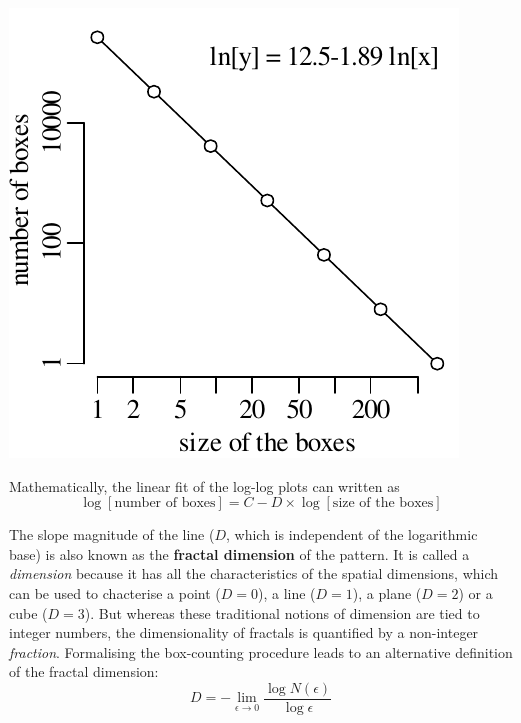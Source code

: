 \noindent\begin{minipage}[t][][b]{.3\textwidth}
  \includegraphics[width=\textwidth]{../figures/sierpinskiboxcounts.pdf}\medskip
\end{minipage}
\begin{minipage}[t][][t]{.7\textwidth}
  \label{fig:sierpinskiboxcounts}
\end{minipage}

Mathematically, the linear fit of the log-log plots can written as
\begin{equation}
  \log[\mbox{number of boxes}] = C - D \times \log[\mbox{size of the boxes}]
  \label{eq:fractaldim}
\end{equation}

The slope magnitude of the line ($D$, which is independent of the
logarithmic base) is also known as the \textbf{fractal dimension} of
the pattern. It is called a \emph{dimension} because it has all the
characteristics of the spatial dimensions, which can be used to
chacterise a point ($D=0$), a line ($D=1$), a plane ($D=2$) or a cube
($D=3$). But whereas these traditional notions of dimension are tied
to integer numbers, the dimensionality of fractals is quantified by a
non-integer \emph{fraction}. Formalising the box-counting procedure
leads to an alternative definition of the fractal dimension:
\begin{equation}
  D = -\lim\limits_{\epsilon \to 0}\frac{\log{N(\epsilon)}}{\log{\epsilon}}
  \label{eq:Minkowski}
\end{equation}

